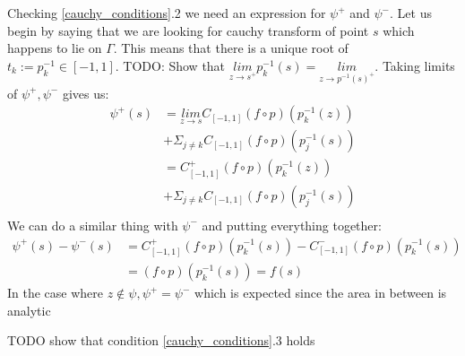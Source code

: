\documentclass{article}
\begin{document}
Checking \eqref{cauchy_conditions}.2 we need an expression for $\psi^+$ and $\psi^-$.
Let us begin by saying that we are looking for cauchy transform of point $s$ which happens to lie on $\Gamma$.
This means that there is a unique root of $t_k := p_k^{-1} \in [-1,1]$.
TODO: Show that $\underset{z\to s^+}{lim} p_k^{-1}(s) =\underset{z\to p^{-1}(s)^+}{lim}$.
Taking limits of $\psi^+, \psi^-$ gives us:
\begin{equation}\begin{split}
\psi^+(s)&=\underset{z\to s}{lim}C_{[-1,1]}(f\circ p)(p_k^{-1}(z)) \\
&+\Sigma_{j\neq k}C_{[-1,1]}(f\circ p)(p_j^{-1}(s)) \\
&=C^+_{[-1,1]}(f\circ p)(p_k^{-1}(z)) \\
&+\Sigma_{j\neq k}C_{[-1,1]}(f\circ p)(p_j^{-1}(s)) \\
\end{split}\end{equation}
We can do a similar thing with $\psi^-$ and putting everything together:
\begin{equation}\begin{split}
\psi^+(s)-\psi^-(s)&=C_{[-1,1]}^+(f\circ p)(p_k^{-1}(s))-C_{[-1,1]}^-(f\circ p)(p_k^{-1}(s)) \\
&= (f\circ p)(p_k^{-1}(s)) = f(s)
\end{split}\end{equation}
In the case where $z \notin \psi, \psi^+=\psi^-$ which is expected since the area in between is analytic

TODO show that condition \eqref{cauchy_conditions}.3 holds
\end{document}
